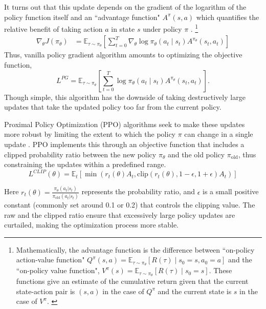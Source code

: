 It turns out that this update depends on the gradient of the logarithm of the policy function itself and an ``advantage function" \( A^\pi (s, a) \) which quantifies the relative benefit of taking action \( a \) in state \( s \) under policy \( \pi \) \cite{SpinningUp2018}.
\footnote{
Mathematically, the advantage function is the difference between ``on-policy action-value function" $Q^{\pi}(s, a) = \mathbb{E}_{\tau \sim \pi_\theta} [R(\tau) \mid s_0 = s, a_0 = a]$ and the ``on-policy value function", $V^{\pi}(s) = \mathbb{E}_{\tau \sim \pi_\theta} [R(\tau) \mid s_0 = s]$. These functions give an estimate of the cumulative return given that the current state-action pair is $(s, a)$ in the case of $Q^\pi$ and the current state is $s$ in the case of $V^{\pi}$.
\label{ft:advantage}
}
\begin{align*}
	\nabla_\theta J(\pi_\theta) &= \mathbb{E}_{\tau \sim \pi_\theta} \left[ \sum\limits_{t=0}^T \nabla_\theta \log 								\pi_\theta (a_t \mid s_t) A^{\pi_\theta} (s_t, a_t) \right]
\end{align*}
Thus, vanilla policy gradient algorithm amounts to optimizing the objective function,
\[
L^{PG} = \mathbb{E}_{\tau \sim \pi_\theta} \left[ \sum\limits_{t=0}^T \log 								\pi_\theta (a_t \mid s_t) A^{\pi_\theta} (s_t, a_t) \right].
\]
Though simple, this algorithm has the downside of taking destructively large updates that take the updated policy too far from the current policy.
\newline

Proximal Policy Optimization (PPO) algorithms seek to make these updates more robust by limiting the extent to which the policy \( \pi \) can change in a single update \cite{schulman2017proximal}.
PPO implements this through an objective function that includes a clipped probability ratio between the new policy \( \pi_\theta \) and the old policy \( \pi_{\text{old}} \), thus constraining the updates within a predefined range.
\[
L^{CLIP}(\theta) = \mathbb{E}_{t} \left[ \min(r_t(\theta) A_t, \text{clip}(r_t(\theta), 1 - \epsilon, 1 + \epsilon) A_t) \right]
\]

Here \( r_t(\theta) = \frac{\pi_\theta(a_t | s_t)}{\pi_{\text{old}}(a_t | s_t)} \) represents the probability ratio, and \( \epsilon \) is a small positive constant (commonly set around 0.1 or 0.2) that controls the clipping value. The raw and the clipped ratio ensure that excessively large policy updates are curtailed, making the optimization process more stable.
\newline

